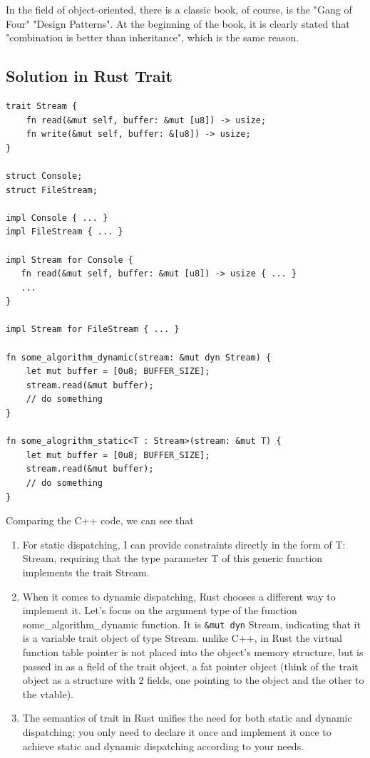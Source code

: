 \documentclass[a4paper]{exam}
\theoremstyle{definition}
\begin{document}
In the field of object-oriented, there is a classic book, of course, is the "Gang of Four" "Design Patterns". At the beginning of the book, it is clearly stated that "combination is better than inheritance", which is the same reason.

\subsection{Solution in Rust Trait}
\begin{verbatim}
trait Stream {
    fn read(&mut self, buffer: &mut [u8]) -> usize;
    fn write(&mut self, buffer: &[u8]) -> usize;
}

struct Console;
struct FileStream;

impl Console { ... }
impl FileStream { ... }

impl Stream for Console {
   fn read(&mut self, buffer: &mut [u8]) -> usize { ... }
   ...
}

impl Stream for FileStream { ... }

fn some_algorithm_dynamic(stream: &mut dyn Stream) {
    let mut buffer = [0u8; BUFFER_SIZE];
    stream.read(&mut buffer);
    // do something
}

fn some_alogrithm_static<T : Stream>(stream: &mut T) {
    let mut buffer = [0u8; BUFFER_SIZE];
    stream.read(&mut buffer);
    // do something
}
\end{verbatim}
Comparing the C++ code, we can see that
\begin{enumerate}
    \item  For static dispatching, I can provide constraints directly in the form of T: Stream, requiring that the type parameter T of this generic function implements the trait Stream.
   \item When it comes to dynamic dispatching, Rust chooses a different way to implement it. Let's focus on the argument type of the function some\_algorithm\_dynamic function. It is \texttt{\&mut dyn} Stream, indicating that it is a variable trait object of type Stream. unlike C++, in Rust the virtual function table pointer is not placed into the object's memory structure, but is passed in as a field of the trait object, a fat pointer object (think of the trait object as a structure with 2 fields, one pointing to the object and the other to the vtable).
   \item The semantics of trait in Rust unifies the need for both static and dynamic dispatching; you only need to declare it once and implement it once to achieve static and dynamic dispatching according to your needs.
\end{enumerate}
\end{document}

